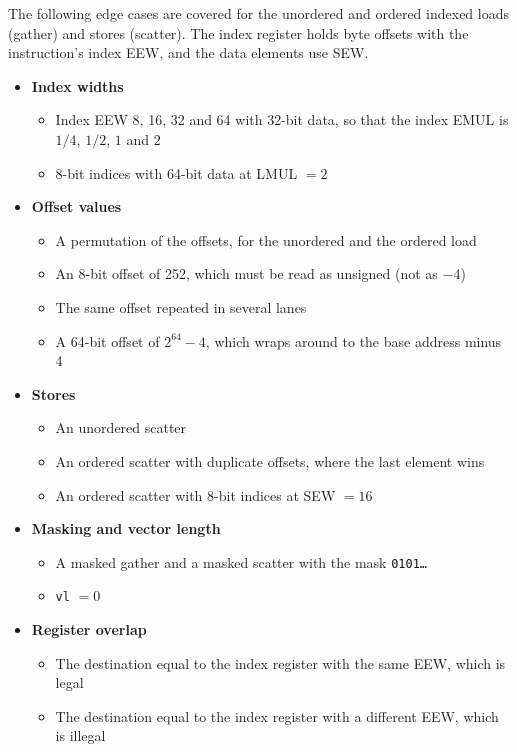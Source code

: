 \documentclass[11pt,a4paper]{article}
\begin{document}
The following edge cases are covered for the unordered and ordered indexed loads (gather) and
stores (scatter). The index register holds byte offsets with the instruction's index EEW, and
the data elements use SEW.

\begin{itemize}
    \item \textbf{Index widths}
    \begin{itemize}
        \item Index EEW 8, 16, 32 and 64 with 32-bit data, so that the index EMUL is $1/4$, $1/2$,
              $1$ and $2$
        \item 8-bit indices with 64-bit data at LMUL $= 2$
    \end{itemize}

    \item \textbf{Offset values}
    \begin{itemize}
        \item A permutation of the offsets, for the unordered and the ordered load
        \item An 8-bit offset of 252, which must be read as unsigned (not as $-4$)
        \item The same offset repeated in several lanes
        \item A 64-bit offset of $2^{64} - 4$, which wraps around to the base address minus 4
    \end{itemize}

    \item \textbf{Stores}
    \begin{itemize}
        \item An unordered scatter
        \item An ordered scatter with duplicate offsets, where the last element wins
        \item An ordered scatter with 8-bit indices at SEW $= 16$
    \end{itemize}

    \item \textbf{Masking and vector length}
    \begin{itemize}
        \item A masked gather and a masked scatter with the mask \texttt{0101\ldots}
        \item \texttt{vl} $= 0$
    \end{itemize}

    \item \textbf{Register overlap}
    \begin{itemize}
        \item The destination equal to the index register with the same EEW, which is legal
        \item The destination equal to the index register with a different EEW, which is illegal
    \end{itemize}
\end{itemize}
\end{document}
